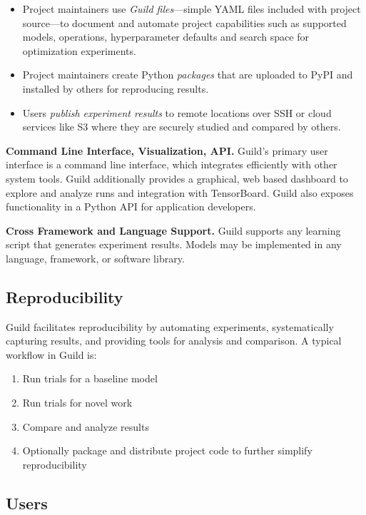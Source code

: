 \documentclass{article}
\begin{document}
\begin{itemize}[topsep=0pt, itemsep=0pt]
\item Project maintainers use \emph{Guild files}---simple YAML files
  included with project source---to document and automate project
  capabilities such as supported models, operations, hyperparameter
  defaults and search space for optimization experiments.

\item Project maintainers create Python \emph{packages} that are
  uploaded to PyPI and installed by others for reproducing results.

\item Users \emph{publish experiment results} to remote locations over
  SSH or cloud services like S3 where they are securely studied and
  compared by others.
\end{itemize}

\textbf{Command Line Interface, Visualization, API.} Guild's primary
user interface is a command line interface, which integrates
efficiently with other system tools. Guild additionally provides a
graphical, web based dashboard to explore and analyze runs and
integration with TensorBoard. Guild also exposes functionality in a
Python API for application developers.

\textbf{Cross Framework and Language Support.} Guild supports any
learning script that generates experiment results. Models may be
implemented in any language, framework, or software library.

\subsection{Reproducibility}

Guild facilitates reproducibility by automating experiments,
systematically capturing results, and providing tools for analysis and
comparison. A typical workflow in Guild is:

\begin{enumerate}[noitemsep, topsep=0pt, partopsep=0pt]
\item Run trials for a baseline model
\item Run trials for novel work
\item Compare and analyze results
\item Optionally package and distribute project code to further
  simplify reproducibility
\end{enumerate}

\subsection{Users}
\end{document}
